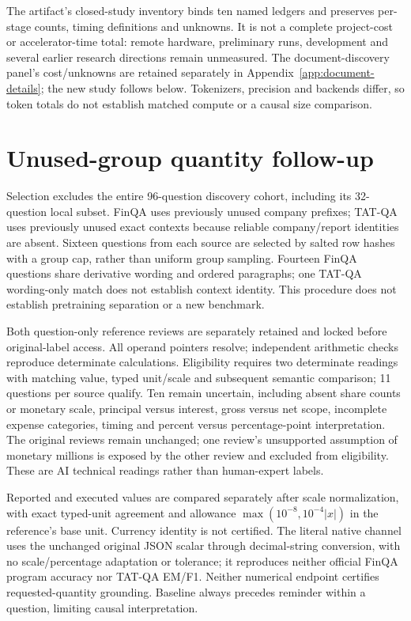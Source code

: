 The artifact's closed-study inventory binds ten named ledgers and preserves per-stage counts, timing definitions and unknowns. It is not a complete project-cost or accelerator-time total: remote hardware, preliminary runs, development and several earlier research directions remain unmeasured. The document-discovery panel's cost/unknowns are retained separately in Appendix~\ref{app:document-details}; the new study follows below. Tokenizers, precision and backends differ, so token totals do not establish matched compute or a causal size comparison.

\section{Unused-group quantity follow-up}\label{app:quantity-transfer}

Selection excludes the entire 96-question discovery cohort, including its 32-question local subset. FinQA uses previously unused company prefixes; TAT-QA uses previously unused exact contexts because reliable company/report identities are absent. Sixteen questions from each source are selected by salted row hashes with a group cap, rather than uniform group sampling. Fourteen FinQA questions share derivative wording and ordered paragraphs; one TAT-QA wording-only match does not establish context identity. This procedure does not establish pretraining separation or a new benchmark.

Both question-only reference reviews are separately retained and locked before original-label access. All operand pointers resolve; independent arithmetic checks reproduce determinate calculations. Eligibility requires two determinate readings with matching value, typed unit/scale and subsequent semantic comparison; 11 questions per source qualify. Ten remain uncertain, including absent share counts or monetary scale, principal versus interest, gross versus net scope, incomplete expense categories, timing and percent versus percentage-point interpretation. The original reviews remain unchanged; one review's unsupported assumption of monetary millions is exposed by the other review and excluded from eligibility. These are AI technical readings rather than human-expert labels.

Reported and executed values are compared separately after scale normalization, with exact typed-unit agreement and allowance $\max(10^{-8},10^{-4}|x|)$ in the reference's base unit. Currency identity is not certified. The literal native channel uses the unchanged original JSON scalar through decimal-string conversion, with no scale/percentage adaptation or tolerance; it reproduces neither official FinQA program accuracy nor TAT-QA EM/F1. Neither numerical endpoint certifies requested-quantity grounding. Baseline always precedes reminder within a question, limiting causal interpretation.

